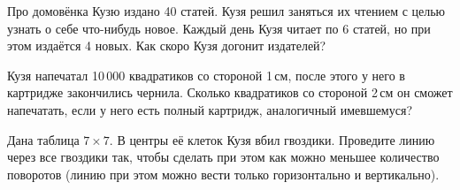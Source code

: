 ﻿
\begin{itemize}

\itA Про домовёнка Кузю издано 40 статей. Кузя решил заняться их чтением с целью узнать о себе что-нибудь новое. Каждый день Кузя читает по 6 статей, но при этом издаётся 4 новых. Как скоро Кузя догонит издателей?

\itB Кузя напечатал 10\,000 квадратиков со стороной 1\,см, после этого у него в картридже закончились чернила. Сколько квадратиков со стороной 2\,см он сможет напечатать, если у него есть полный картридж, аналогичный имевшемуся?

\itC Дана таблица $7 \times 7$. В центры её клеток Кузя вбил гвоздики. Проведите линию через все гвоздики так, чтобы сделать при этом как можно меньшее количество поворотов (линию при этом можно вести только горизонтально и вертикально).
\end{itemize}